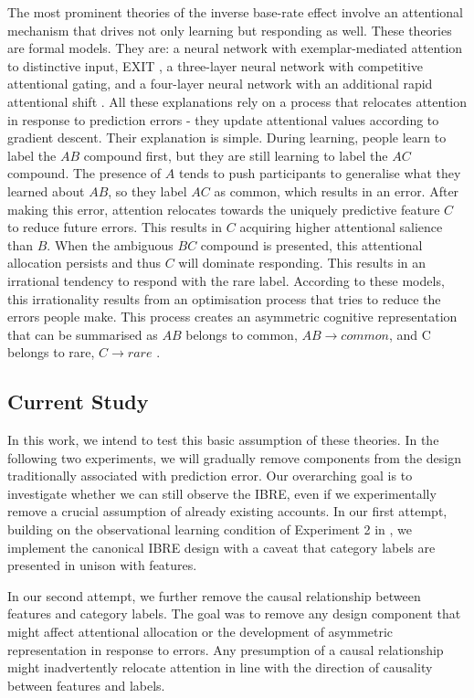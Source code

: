 \documentclass[10pt,letterpaper]{article}
\begin{document}
The most prominent theories of the inverse base-rate effect involve an attentional mechanism that drives not only learning but responding as well.
These theories are formal models.
They are: a neural network with exemplar-mediated attention to distinctive input, EXIT \cite{kruschke2001toward}, a three-layer neural network with competitive attentional gating, and a four-layer neural network with an additional rapid attentional shift \cite{paskewitz2020dissecting}.
All these explanations rely on a process that relocates attention in response to prediction errors - they update attentional values according to gradient descent.
Their explanation is simple.
During learning, people learn to label the $AB$ compound first, but they are still learning to label the $AC$ compound.
The presence of $A$ tends to push participants to generalise what they learned about $AB$, so they label $AC$ as common, which results in an error.
After making this error, attention relocates towards the uniquely predictive feature $C$ to reduce future errors.
This results in $C$ acquiring higher attentional salience than $B$.
When the ambiguous $BC$ compound is presented, this attentional allocation persists and thus $C$ will dominate responding.
This results in an irrational tendency to respond with the rare label.
According to these models, this irrationality results from an optimisation process that tries to reduce the errors people make.
This process creates an asymmetric cognitive representation that can be summarised as $AB$ belongs to common, $AB \to common$, and C belongs to rare, $C \to rare$ \cite{kruschke2001inverse}.

\subsection{Current Study}

In this work, we intend to test this basic assumption of these theories.
In the following two experiments, we will gradually remove components from the design traditionally associated with prediction error.
Our overarching goal is to investigate whether we can still observe the IBRE, even if we experimentally remove a crucial assumption of already existing accounts.
In our first attempt, building on the observational learning condition of Experiment 2 in , we implement the canonical IBRE design with a caveat that category labels are presented in unison with features.

In our second attempt, we further remove the causal relationship between features and category labels.
The goal was to remove any design component that might affect attentional allocation or the development of asymmetric representation in response to errors.
Any presumption of a causal relationship might inadvertently relocate attention in line with the direction of causality between features and labels.
\end{document}

